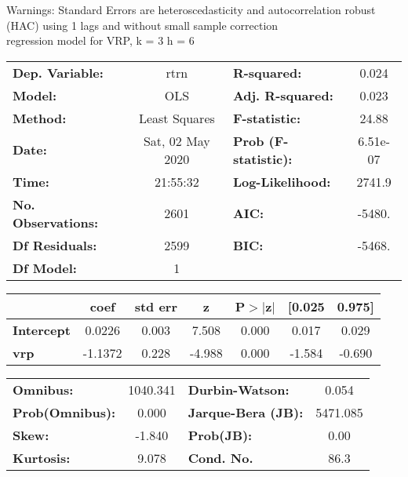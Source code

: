 Warnings: \newline
 [1] Standard Errors are heteroscedasticity and autocorrelation robust (HAC) using 1 lags and without small sample correction\\ 

regression model for VRP, k = 3 h = 6\begin{center}
\begin{tabular}{lclc}
\toprule
\textbf{Dep. Variable:}    &       rtrn       & \textbf{  R-squared:         } &     0.024   \\
\textbf{Model:}            &       OLS        & \textbf{  Adj. R-squared:    } &     0.023   \\
\textbf{Method:}           &  Least Squares   & \textbf{  F-statistic:       } &     24.88   \\
\textbf{Date:}             & Sat, 02 May 2020 & \textbf{  Prob (F-statistic):} &  6.51e-07   \\
\textbf{Time:}             &     21:55:32     & \textbf{  Log-Likelihood:    } &    2741.9   \\
\textbf{No. Observations:} &        2601      & \textbf{  AIC:               } &    -5480.   \\
\textbf{Df Residuals:}     &        2599      & \textbf{  BIC:               } &    -5468.   \\
\textbf{Df Model:}         &           1      & \textbf{                     } &             \\
\bottomrule
\end{tabular}
\begin{tabular}{lcccccc}
                   & \textbf{coef} & \textbf{std err} & \textbf{z} & \textbf{P$> |$z$|$} & \textbf{[0.025} & \textbf{0.975]}  \\
\midrule
\textbf{Intercept} &       0.0226  &        0.003     &     7.508  &         0.000        &        0.017    &        0.029     \\
\textbf{vrp}       &      -1.1372  &        0.228     &    -4.988  &         0.000        &       -1.584    &       -0.690     \\
\bottomrule
\end{tabular}
\begin{tabular}{lclc}
\textbf{Omnibus:}       & 1040.341 & \textbf{  Durbin-Watson:     } &    0.054  \\
\textbf{Prob(Omnibus):} &   0.000  & \textbf{  Jarque-Bera (JB):  } & 5471.085  \\
\textbf{Skew:}          &  -1.840  & \textbf{  Prob(JB):          } &     0.00  \\
\textbf{Kurtosis:}      &   9.078  & \textbf{  Cond. No.          } &     86.3  \\
\bottomrule
\end{tabular}
\end{center}

